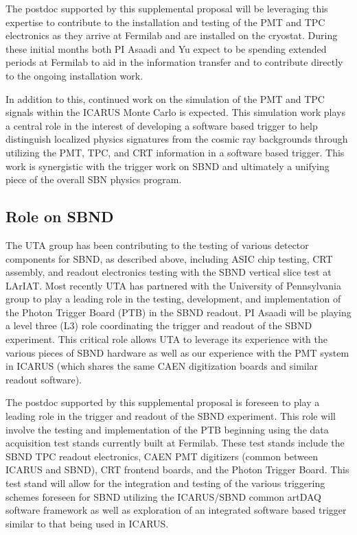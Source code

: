 The postdoc supported by this supplemental proposal will be leveraging this expertise to contribute to the installation and testing of the PMT and TPC electronics as they arrive at Fermilab and are installed on the cryostat. During these initial months both PI Asaadi and Yu expect to be spending extended periods at Fermilab to aid in the information transfer and to contribute directly to the ongoing installation work.

In addition to this, continued work on the simulation of the PMT and TPC signals within the ICARUS Monte Carlo is expected. This simulation work plays a central role in the interest of developing a software based trigger to help distinguish localized physics signatures from the cosmic ray backgrounds through utilizing the PMT, TPC, and CRT information in a software based trigger. This work is synergistic with the trigger work on SBND and ultimately a unifying piece of the overall SBN physics program.

\subsection*{Role on SBND}
The UTA group has been contributing to the testing of various detector components for SBND, as described above, including ASIC chip testing, CRT assembly, and readout electronics testing with the SBND vertical slice test at LArIAT. Most recently UTA has partnered with the University of Pennsylvania group to play a leading role in the testing, development, and implementation of the Photon Trigger Board (PTB) in the SBND readout. PI Asaadi will be playing a level three (L3) role coordinating the trigger and readout of the SBND experiment. This critical role allows UTA to leverage its experience with the various pieces of SBND hardware as well as our experience with the PMT system in ICARUS (which shares the same CAEN digitization boards and similar readout software).

The postdoc supported by this supplemental proposal is foreseen to play a leading role in the trigger and readout of the SBND experiment. This role will involve the testing and implementation of the PTB beginning using the data acquisition test stands currently built at Fermilab. These test stands include the SBND TPC readout electronics, CAEN PMT digitizers (common between ICARUS and SBND), CRT frontend boards, and the Photon Trigger Board. This test stand will allow for the integration and testing of the various triggering schemes foreseen for SBND utilizing the ICARUS/SBND common artDAQ software framework  as well as exploration of an integrated software based trigger similar to that being used in ICARUS. 

